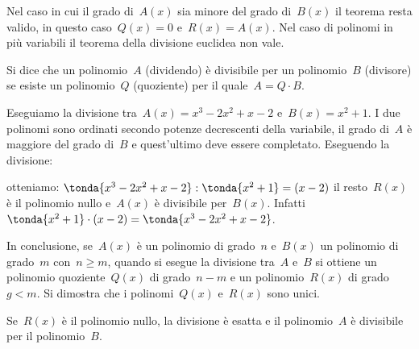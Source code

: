 \osservazione Nel caso in cui il grado di~\(A(x)\) sia minore del grado 
di~\(B(x)\) il teorema resta valido, 
in questo caso~\(Q(x)=0\) e~\(R(x)=A(x)\).
Nel caso di polinomi in più variabili il teorema della divisione 
euclidea non vale.

\begin{definizione}
 Si dice che un polinomio~\(A\) (dividendo) è divisibile per un 
 polinomio~\(B\)  (divisore) se esiste un polinomio~\(Q\) (quoziente) 
 per il quale~\(A=Q \cdot B\).
\end{definizione}

 \begin{esempio}
 Eseguiamo la divisione tra~\(A(x)=x^3-2x^2+x-2\) e~\(B(x)=x^2+1\).
I due polinomi sono ordinati secondo potenze decrescenti della variabile, 
il grado di~\(A\) è maggiore del grado di~\(B\) e quest'ultimo
deve essere completato. 
Eseguendo la divisione: 
\begin{center}
\divdue
\end{center}
 \end{esempio}
\noindent otteniamo:
\(\tonda{x^3-2x^2+x-2}:\tonda{x^2+1}=(x-2)\) 
il resto~\(R(x)\) è il polinomio nullo e~\(A(x)\) è divisibile per~\(B(x)\).
Infatti~\(\tonda{x^2+1}\cdot (x-2)=\tonda{x^3-2x^2+x-2}\).

In conclusione, se~\(A(x)\) è un polinomio di grado~\(n\) e~\(B(x)\) un 
polinomio di grado~\(m\) con~\(n\ge m\), quando si esegue la divisione 
tra~\(A\) e~\(B\) si ottiene un polinomio quoziente~\(Q(x)\) 
di grado~\(n-m\) e un polinomio~\(R(x)\) di grado~\(g<m\).
Si dimostra che i polinomi~\(Q(x)\) e~\(R(x)\) sono unici.

Se~\(R(x)\) è il polinomio nullo, la divisione è esatta e il polinomio~\(A\) 
è divisibile per il polinomio~\(B\).


